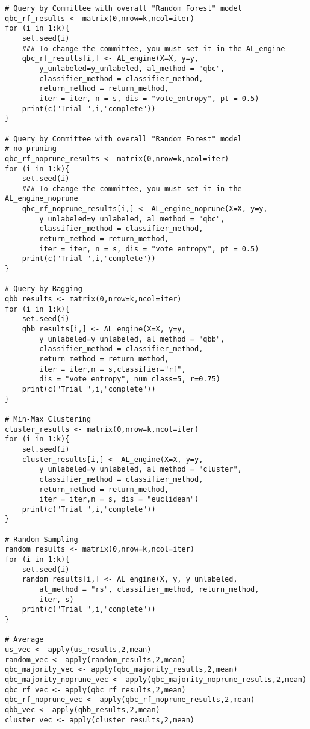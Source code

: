 {\begin{lstlisting}
# Query by Committee with overall "Random Forest" model
qbc_rf_results <- matrix(0,nrow=k,ncol=iter)
for (i in 1:k){
	set.seed(i)
	### To change the committee, you must set it in the AL_engine
	qbc_rf_results[i,] <- AL_engine(X=X, y=y, 
		y_unlabeled=y_unlabeled, al_method = "qbc", 
		classifier_method = classifier_method, 
		return_method = return_method, 
		iter = iter, n = s, dis = "vote_entropy", pt = 0.5)
	print(c("Trial ",i,"complete"))
}

# Query by Committee with overall "Random Forest" model
# no pruning
qbc_rf_noprune_results <- matrix(0,nrow=k,ncol=iter)
for (i in 1:k){
	set.seed(i)
	### To change the committee, you must set it in the AL_engine_noprune
	qbc_rf_noprune_results[i,] <- AL_engine_noprune(X=X, y=y, 
		y_unlabeled=y_unlabeled, al_method = "qbc", 
		classifier_method = classifier_method, 
		return_method = return_method, 
		iter = iter, n = s, dis = "vote_entropy", pt = 0.5)
	print(c("Trial ",i,"complete"))
}

# Query by Bagging
qbb_results <- matrix(0,nrow=k,ncol=iter)
for (i in 1:k){
	set.seed(i)
	qbb_results[i,] <- AL_engine(X=X, y=y, 
		y_unlabeled=y_unlabeled, al_method = "qbb", 
		classifier_method = classifier_method,
		return_method = return_method, 
		iter = iter,n = s,classifier="rf", 
		dis = "vote_entropy", num_class=5, r=0.75)
	print(c("Trial ",i,"complete"))
}

# Min-Max Clustering
cluster_results <- matrix(0,nrow=k,ncol=iter)
for (i in 1:k){
	set.seed(i)
	cluster_results[i,] <- AL_engine(X=X, y=y,
		y_unlabeled=y_unlabeled, al_method = "cluster", 
		classifier_method = classifier_method, 
		return_method = return_method, 
		iter = iter,n = s, dis = "euclidean")
	print(c("Trial ",i,"complete"))
}

# Random Sampling
random_results <- matrix(0,nrow=k,ncol=iter)
for (i in 1:k){
	set.seed(i)
	random_results[i,] <- AL_engine(X, y, y_unlabeled, 
		al_method = "rs", classifier_method, return_method, 
		iter, s)
	print(c("Trial ",i,"complete"))
}

# Average
us_vec <- apply(us_results,2,mean)
random_vec <- apply(random_results,2,mean)
qbc_majority_vec <- apply(qbc_majority_results,2,mean)
qbc_majority_noprune_vec <- apply(qbc_majority_noprune_results,2,mean)
qbc_rf_vec <- apply(qbc_rf_results,2,mean)
qbc_rf_noprune_vec <- apply(qbc_rf_noprune_results,2,mean)
qbb_vec <- apply(qbb_results,2,mean)
cluster_vec <- apply(cluster_results,2,mean)


\end{lstlisting}}
